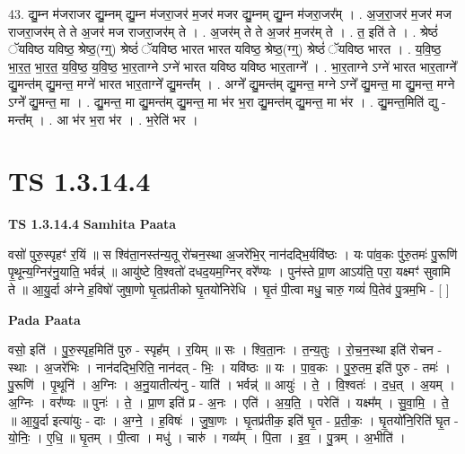\documentclass[17pt]{extarticle}
\begin{document}
43. द्यु॒म्न म॑जराजर द्यु॒म्नम् द्यु॒म्न म॑जरा॒जर॑ म॒जर॑ मजर द्यु॒म्नम् द्यु॒म्न म॑जरा॒जर᳚म् । . अ॒ज॒रा॒जर॑ म॒जर॑ मज राजरा॒जर॑म् ते ते अ॒जर॑ मज राजरा॒जर॑म् ते । . अ॒जर॑म् ते ते अ॒जर॑ म॒जर॑म् ते । . त॒ इति॑ ते । . श्रेष्ठं॑ ॅयविष्ठ यविष्ठ॒ श्रेष्ठ॒(ग्ग्॒) श्रेष्ठं॑ ॅयविष्ठ भारत भारत यविष्ठ॒ श्रेष्ठ॒(ग्ग्॒) श्रेष्ठं॑ ॅयविष्ठ भारत । . य॒वि॒ष्ठ॒ भा॒र॒त॒ भा॒र॒त॒ य॒वि॒ष्ठ॒ य॒वि॒ष्ठ॒ भा॒र॒ताग्ने ऽग्ने॑ भारत यविष्ठ यविष्ठ भार॒ताग्ने᳚ । . भा॒र॒ताग्ने ऽग्ने॑ भारत भार॒ताग्ने᳚ द्यु॒मन्त॑म् द्यु॒मन्त॒ मग्ने॑ भारत भार॒ताग्ने᳚ द्यु॒मन्त᳚म् । . अग्ने᳚ द्यु॒मन्त॑म् द्यु॒मन्त॒ मग्ने ऽग्ने᳚ द्यु॒मन्त॒ मा द्यु॒मन्त॒ मग्ने ऽग्ने᳚ द्यु॒मन्त॒ मा । . द्यु॒मन्त॒ मा द्यु॒मन्त॑म् द्यु॒मन्त॒ मा भ॑र भ॒रा द्यु॒मन्त॑म् द्यु॒मन्त॒ मा भ॑र । . द्यु॒मन्त॒मिति॑ द्यु - मन्त᳚म् । . आ भ॑र भ॒रा भ॑र । . भ॒रेति॑ भर । \newline
\pagebreak
{}
\section*{ TS 1.3.14.4 }

\textbf{TS 1.3.14.4 } \newline
\textbf{Samhita Paata} \newline

वसो॑ पुरु॒स्पृहꣳ॑ र॒यिं ॥ स श्वि॑ता॒नस्त॑न्य॒तू रो॑चन॒स्था अ॒जरे॑भि॒र् नान॑दद्भि॒र्यवि॑ष्ठः । यः पा॑व॒कः पु॑रु॒तमः॑ पु॒रूणि॑ पृ॒थून्य॒ग्निर॑नु॒याति॒ भर्वन्न्॑ ॥ आयु॑ष्टे वि॒श्वतो॑ दधद॒यम॒ग्निर् वरे᳚ण्यः । पुन॑स्ते प्रा॒ण आऽय॑ति॒ परा॒ यक्ष्मꣳ॑ सुवामि ते ॥ आ॒यु॒र्दा अ॑ग्ने ह॒विषो॑ जुषा॒णो घृ॒तप्र॑तीको घृ॒तयो॑निरेधि । घृ॒तं पी॒त्वा मधु॒ चारु॒ गव्यं॑ पि॒तेव॑ पु॒त्रम॒भि - [ ] \newline

\textbf{Pada Paata} \newline

वसो॒ इति॑ । पु॒रु॒स्पृह॒मिति॑ पुरु - स्पृह᳚म् । र॒यिम् ॥ सः । श्वि॒ता॒नः । त॒न्य॒तुः । रो॒च॒न॒स्था इति॑ रोचन - स्थाः । अ॒जरे॑भिः । नान॑दद्भि॒रिति॒ नान॑दत् - भिः॒ । यवि॑ष्ठः ॥ यः । पा॒व॒कः । पु॒रु॒तम॒ इति॑ पुरु - तमः॑ । पु॒रूणि॑ । पृ॒थूनि॑ । अ॒ग्निः । अ॒नु॒यातीत्य॑नु - याति॑ । भर्वन्न्॑ ॥ आयुः॑ । ते॒ । वि॒श्वतः॑ । द॒ध॒त् । अ॒यम् । अ॒ग्निः । वर᳚ण्यः ॥ पुनः॑ । ते॒ । प्रा॒ण इति॑ प्र - अ॒नः । एति॑ । अ॒य॒ति॒ । परेति॑ । यक्ष्म᳚म् । सु॒वा॒मि॒ । ते॒ ॥ आ॒यु॒र्दा इत्या॑युः - दाः । अ॒ग्ने॒ । ह॒विषः॑ । जु॒षा॒णः । घृ॒तप्र॑तीक॒ इति॑ घृ॒त - प्र॒ती॒कः॒ । घृ॒तयो॑नि॒रिति॑ घृ॒त - यो॒निः॒ । ए॒धि॒ ॥ घृ॒तम् । पी॒त्वा । मधु॑ । चारु॑ । गव्य᳚म् । पि॒ता । इ॒व॒ । पु॒त्रम् । अ॒भीति॑ ।  \newline
\end{document}

